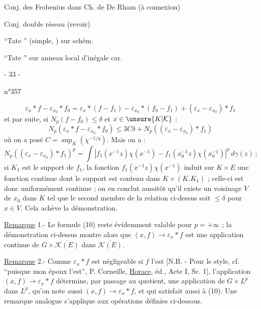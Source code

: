 Conj. des Frobenius dans Ch. de De Rham (à connexion)

Conj.  double réseau (revoir)

``Tate '' (simple, ) sur schém.

``Tate '' sur anneau local d'inégale car.
\begin{center}- 33 -\end{center}
\begin{flushright}n°357\end{flushright}
\[
\varepsilon_x*f-\varepsilon_{x_0}*f_0
=\varepsilon_x*(f-f_1)-\varepsilon_{x_0}*(f_0-f_1)+(\varepsilon_x-\varepsilon_{x_0})*f_1
\]
et par suite, si $N_p(f-f_0)\leq\delta$ et $x\in\unsure{K|\mathcal K}$ :
\[
N_p(\varepsilon_x*f-\varepsilon_{x_0}*f_0)\leq3C\delta+N_p((\varepsilon_x-\varepsilon_{x_0})*f_1)
\]
où on a posé $C=\sup_K(\chi^{-1/q})$. Mais on a :
\[
N_p((\varepsilon_x-\varepsilon_{x_0})*f_1)^p
=\int\left|f_1(x^{-1}z)\chi(x^{-1})-f_1(x_0^{-1}z)\chi(x_0^{-1})\right|^p\,d\gamma(z)\ ;
\]
si $K_1$ est le support de $f_1$, la fonction $f_1(x^{-1}z)\chi(x^{-1})$ induit sur $K\times E$ une fonction continue dont le support est contenu dans $K\times(K.K_1)$ ; celle-ci est donc uniformément continue ; on en conclut aussitôt qu'il existe un voisinage $V$ de $x_0$ dans $K$ tel que le second membre de la relation ci-dessus soit $\leq\delta$ pour $x\in V$. Cela achève la démonstration.

\uline{Remarque} 1.- Le formule (10) reste évidemment valable pour $p=+\infty$ ; la démonstration ci-dessus montre alors que $(x,f)\to\varepsilon_x*f$ est une application continue de $G\times\overline{\mathcal K(E)}$ dans $\overline{\mathcal K(E)}$.

\uline{Remarque} 2.- Comme $\varepsilon_x*f$ est négligeable si $f$ l'est [N.B. - Pour le style, cf. ``puisque mon époux l'est'', P. Corneille, \uline{Horace},  éd., Acte I, Sc. 1], l'application $(x,f)\to\varepsilon_x*f$ détermine, par passage au quotient, une application de $G\times L^p$ dans $L^p$, qu'on note aussi $(x,f)\to\varepsilon_x*f$, et qui satisfait aussi à (10). Une remarque analogue s'applique aux opérations définies ci-dessous.

